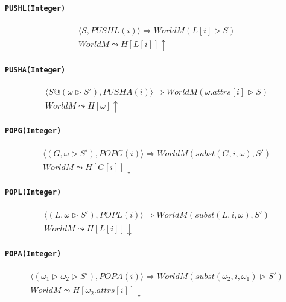 \documentclass[]{article}
\numberwithin{equation}{section}
\numberwithin{figure}{section}
\numberwithin{table}{section}
\begin{document}
\paragraph{\texttt{PUSHL(Integer)}}\label{pushlinteger}

\begin{gather*}
  \langle S, PUSHL(i)\rangle \Rightarrow WorldM (L[i] \rhd S )\\
  WorldM \leadsto H[L[i]] \uparrow
\end{gather*}

\paragraph{\texttt{PUSHA(Integer)}}\label{pushainteger}

\begin{gather*}
  \langle S@(\omega \rhd S'), PUSHA(i)\rangle \Rightarrow WorldM (\omega.attrs[i] \rhd S )\\
  WorldM \leadsto H[\omega] \uparrow
\end{gather*}

\paragraph{\texttt{POPG(Integer)}}\label{popginteger}

\begin{gather*}
  \langle (G, \omega \rhd S'), POPG(i)\rangle \Rightarrow WorldM (subst(G, i, \omega), S' )\\
  WorldM \leadsto H[G[i]] \downarrow
\end{gather*}

\paragraph{\texttt{POPL(Integer)}}\label{poplinteger}

\begin{gather*}
  \langle (L, \omega \rhd S'), POPL(i)\rangle \Rightarrow WorldM (subst(L, i, \omega), S' )\\
  WorldM \leadsto H[L[i]] \downarrow
\end{gather*}

\paragraph{\texttt{POPA(Integer)}}\label{popainteger}

\begin{gather*}
  \langle (\omega_1 \rhd \omega_2 \rhd S'), POPA(i)\rangle \Rightarrow WorldM (subst(\omega_2, i, \omega_1) \rhd S' )\\
  WorldM \leadsto H[\omega_2.attrs[i]] \downarrow
\end{gather*}
\end{document}
